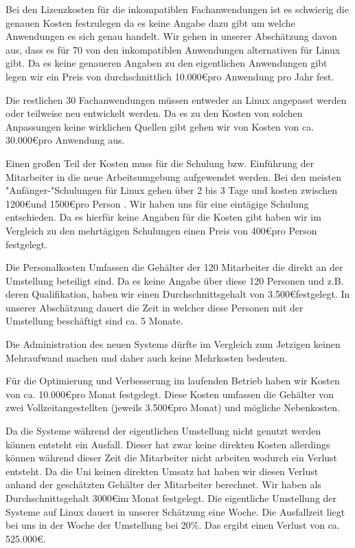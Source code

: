 \documentclass[12pt,utf8]{scrartcl}
\begin{document}
Bei den Lizenzkosten für die inkompatiblen Fachanwendungen ist es schwierig die genauen Kosten festzulegen da es keine Angabe dazu gibt um welche Anwendungen es sich genau handelt. Wir gehen in unserer Abschätzung davon aus, dass es für 70 von den inkompatiblen Anwendungen alternativen für Linux gibt. Da es keine genaueren Angaben zu den eigentlichen Anwendungen gibt legen wir ein Preis von durchschnittlich 10.000\euro \space pro Anwendung pro Jahr fest.

Die restlichen 30 Fachanwendungen müssen entweder an Linux angepasst werden oder teilweise neu entwickelt werden. Da es zu den Kosten von solchen Anpassungen keine wirklichen Quellen gibt gehen wir von Kosten von ca. 30.000\euro pro Anwendung aus.

Einen großen Teil der Kosten muss für die Schulung bzw. Einführung der Mitarbeiter in die neue Arbeitsumgebung aufgewendet werden. Bei den meisten "Anfänger-"Schulungen für Linux gehen über 2 bis 3 Tage und kosten zwischen 1200\euro \space und 1500\euro \space pro Person . Wir haben uns für eine eintägige Schulung entschieden. Da es hierfür keine Angaben für die Kosten gibt haben wir im Vergleich zu den mehrtägigen Schulungen einen Preis von 400\euro \space pro Person festgelegt.

Die Personalkosten Umfassen die Gehälter der 120 Mitarbeiter die direkt an der Umstellung beteiligt sind. Da es keine Angabe über diese 120 Personen und z.B. deren Qualifikation, haben wir einen Durchschnittsgehalt von 3.500\euro \space festgelegt. In unserer Abschätzung dauert die Zeit in welcher diese Personen mit der Umstellung beschäftigt sind ca. 5 Monate.

Die Administration des neuen Systems dürfte im Vergleich zum Jetzigen keinen Mehraufwand machen und daher auch keine Mehrkosten bedeuten.

Für die Optimierung und Verbesserung im laufenden Betrieb haben wir Kosten von ca. 10.000\euro \space pro Monat festgelegt. Diese Kosten umfassen die Gehälter von zwei Vollzeitangestellten (jeweils 3.500\euro \space pro Monat) und mögliche Nebenkosten.

Da die Systeme während der eigentlichen Umstellung nicht genutzt werden können entsteht ein Ausfall. Dieser hat zwar keine direkten Kosten allerdings können während dieser Zeit die Mitarbeiter nicht arbeiten wodurch ein Verlust entsteht. Da die Uni keinen direkten Umsatz hat haben wir diesen Verlust anhand der geschätzten Gehälter der Mitarbeiter berechnet. Wir haben als Durchschnittsgehalt 3000\euro \space im Monat festgelegt. 
Die eigentliche Umstellung der Systeme auf Linux dauert in unserer Schätzung eine Woche. Die Ausfallzeit liegt bei uns in der Woche der Umstellung bei 20\%. Das ergibt einen Verlust von ca. 525.000\euro .
\end{document}
